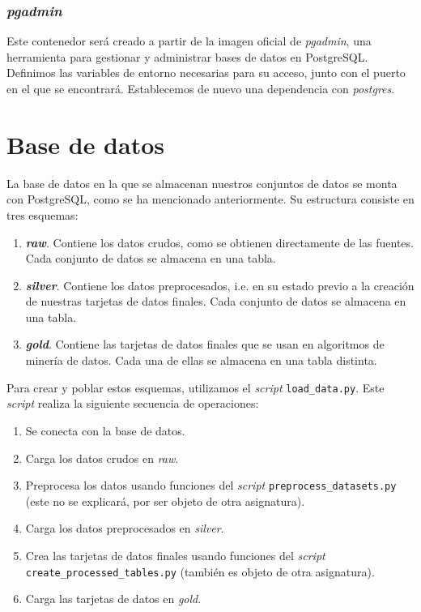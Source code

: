 \documentclass[11pt,a4paper]{article}
\begin{document}
\subsubsection*{\textit{pgadmin}}

Este contenedor será creado a partir de la imagen oficial de \textit{pgadmin}, una herramienta para gestionar y administrar bases de datos en PostgreSQL. Definimos las variables de entorno necesarias para su acceso, junto con el puerto en el que se encontrará. Establecemos de nuevo una dependencia con \textit{postgres}.

\section{Base de datos}

La base de datos en la que se almacenan nuestros conjuntos de datos se monta con PostgreSQL, como se ha mencionado anteriormente. Su estructura consiste en tres esquemas:

\begin{enumerate}
    \item \textbf{\textit{raw}}. Contiene los datos crudos, como se obtienen directamente de las fuentes. Cada conjunto de datos se almacena en una tabla.
    \item \textbf{\textit{silver}}. Contiene los datos preprocesados, i.e. en su estado previo a la creación de nuestras tarjetas de datos finales. Cada conjunto de datos se almacena en una tabla.
    \item \textbf{\textit{gold}}. Contiene las tarjetas de datos finales que se usan en algoritmos de minería de datos. Cada una de ellas se almacena en una tabla distinta.
\end{enumerate}

Para crear y poblar estos esquemas, utilizamos el \textit{script} \lstinline!load_data.py!. Este \textit{script} realiza la siguiente secuencia de operaciones:

\begin{enumerate}
    \item Se conecta con la base de datos.
    \item Carga los datos crudos en \textit{raw}.
    \item Preprocesa los datos usando funciones del \textit{script} \lstinline!preprocess_datasets.py! (este no se explicará, por ser objeto de otra asignatura).
    \item Carga los datos preprocesados en \textit{silver}.
    \item Crea las tarjetas de datos finales usando funciones del \textit{script} \lstinline!create_processed_tables.py! (también es objeto de otra asignatura).
    \item Carga las tarjetas de datos en \textit{gold}.
\end{enumerate}
\end{document}
